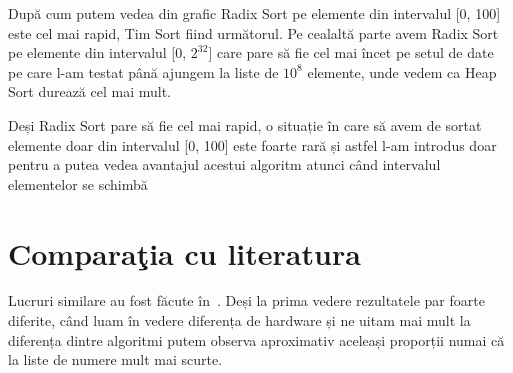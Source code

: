 \documentclass[12pt]{article}
\begin{document}
\begin{figure}[!h]
    \centering
\end{figure}

După cum putem vedea din grafic Radix Sort pe elemente din intervalul [0, 100] este cel mai rapid, Tim Sort fiind următorul.
Pe cealaltă parte avem Radix Sort pe elemente din intervalul [0, $2^{32}$] care pare să fie cel mai încet pe setul de date pe care l-am testat până
ajungem la liste de $10^8$ elemente, unde vedem ca Heap Sort durează cel mai mult.

Deși Radix Sort pare să fie cel mai rapid, o situație în care să avem de sortat elemente doar din intervalul [0, 100] este
foarte rară și astfel l-am introdus doar pentru a putea vedea avantajul acestui algoritm atunci când intervalul elementelor
se schimbă

\pagebreak


\section{Comparaţia cu literatura}

Lucruri similare au fost făcute în~\cite{al2013review}. Deși la prima vedere rezultatele par foarte diferite,
când luam în vedere diferența de hardware și ne uitam mai mult la diferența dintre algoritmi putem observa aproximativ
aceleași proporții numai că la liste de numere mult mai scurte.
\end{document}
